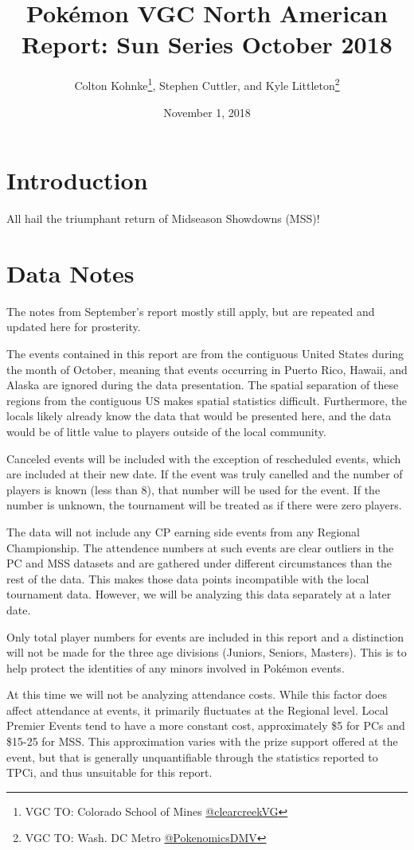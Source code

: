 \documentclass[11pt,twocolumn]{article}
\title{Pokémon VGC North American Report: Sun Series October 2018}
\author{Colton Kohnke\thanks{VGC TO: Colorado School of Mines \href{https://twitter.com/clearcreekVG}{@clearcreekVG}}, Stephen Cuttler, and Kyle Littleton\thanks{VGC TO: Wash. DC Metro \href{https://twitter.com/PokenomicsDMV}{@PokenomicsDMV}}}
\date{November 1, 2018}
\begin{document}
\maketitle

\section*{Introduction}

All hail the triumphant return of Midseason Showdowns (MSS)!

\section*{Data Notes}

The notes from September's report mostly still apply, but are repeated and updated here for prosterity.

The events contained in this report are from the contiguous United States during the month of October, meaning that events occurring in Puerto Rico, Hawaii, and Alaska are ignored during the data presentation. The spatial separation of these regions from the contiguous US makes spatial statistics difficult. Furthermore, the locals likely already know the data that would be presented here, and the data would be of little value to players outside of the local community.

Canceled events will be included with the exception of rescheduled events, which are included at their new date. If the event was truly canelled and the number of players is known (less than 8), that number will be used for the event. If the number is unknown, the tournament will be treated as if there were zero players.

The data will not include any CP earning side events from any Regional Championship. The attendence numbers at such events are clear outliers in the PC and MSS datasets and are gathered under different circumstances than the rest of the data. This makes those data points incompatible with the local tournament data. However, we will be analyzing this data separately at a later date. 

Only total player numbers for events are included in this report and a distinction will not be made for the three age divisions (Juniors, Seniors, Masters). This is to help protect the identities of any minors involved in Pokémon events.

At this time we will not be analyzing attendance costs. While this factor does affect attendance at events, it primarily fluctuates at the Regional level. Local Premier Events tend to have a more constant cost, approximately \$5 for PCs and \$15-25 for MSS. This approximation varies with the prize support offered at the event, but that is generally unquantifiable through the statistics reported to TPCi, and thus unsuitable for this report. 
\end{document}

